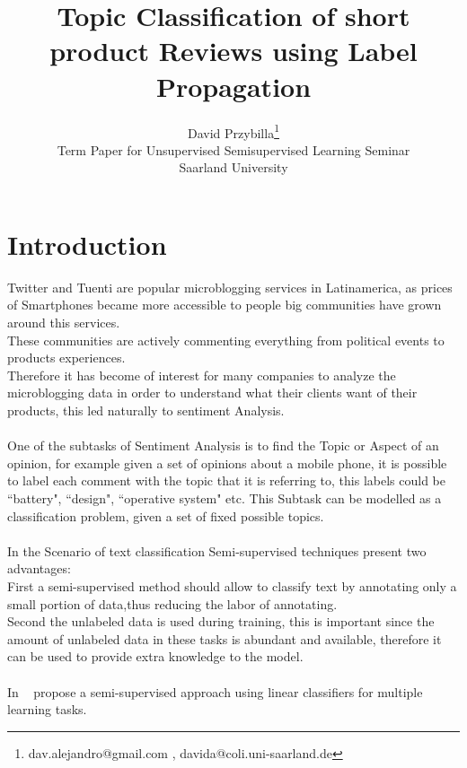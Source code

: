 \documentclass[4pt,a4paper,twocolumn]{article}
\author{David Przybilla\footnote{dav.alejandro@gmail.com , davida@coli.uni-saarland.de}\\ Term Paper for Unsupervised Semisupervised
Learning Seminar\\ Saarland University}
\title{Topic Classification of short product Reviews using Label Propagation}
\begin{document}
\twocolumn[
	 \begin{@twocolumnfalse}
    \maketitle
   \begin{abstract}
      ...
    \end{abstract}
  \end{@twocolumnfalse}
  ]




\part*{Introduction}
Twitter and Tuenti are popular microblogging services in Latinamerica,
as prices of Smartphones became more accessible to people big communities
have grown around this services.\\
These communities are actively commenting everything from political events to products experiences.\\
Therefore it has become of interest for many companies to analyze the microblogging data in order to understand
what their clients want of their products, this led naturally to sentiment Analysis.\\ 
\\
One of the subtasks of Sentiment Analysis is to find the Topic or Aspect of an opinion,
for example given a set of opinions about a mobile phone, it is possible to label each comment
with the topic that it is referring to, this labels could be ``battery", ``design", ``operative system" etc.
This Subtask can be modelled as a classification problem, given a set of fixed possible topics.\\
\\
In the Scenario of text classification Semi-supervised techniques present two advantages:\\
First a semi-supervised method should allow to classify text by annotating only a small portion of data,thus reducing the labor of annotating.\\
Second the unlabeled data is used during training, this is important since the amount of unlabeled data in these tasks is abundant and available, therefore it can be used to provide extra knowledge to the model.\\
\\
In ~\cite{Ando:2005:FLP:1046920.1194905} propose a semi-supervised approach using linear classifiers for multiple learning tasks.\\
\end{document}
